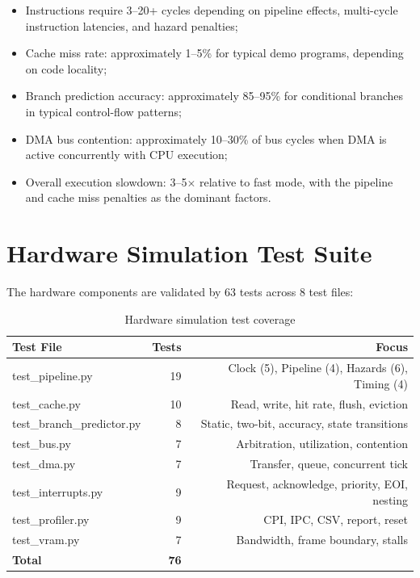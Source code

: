 \documentclass[12pt,a4paper,twoside]{book}
\theoremstyle{trinarytheorem}
\theoremstyle{trinarydefinition}
\newcommand{\code}[1]{\textsf{#1}}
\begin{document}
\begin{itemize}
    \item Instructions require 3--20+ cycles depending on pipeline effects,
          multi-cycle instruction latencies, and hazard penalties;
    \item Cache miss rate: approximately 1--5\% for typical demo programs,
          depending on code locality;
    \item Branch prediction accuracy: approximately 85--95\% for conditional
          branches in typical control-flow patterns;
    \item DMA bus contention: approximately 10--30\% of bus cycles when DMA
          is active concurrently with CPU execution;
    \item Overall execution slowdown: 3--5$\times$ relative to fast mode,
          with the pipeline and cache miss penalties as the dominant factors.
\end{itemize}

\section{Hardware Simulation Test Suite}

The hardware components are validated by 63 tests across 8 test files:

\begin{table}[H]
\centering
\caption{Hardware simulation test coverage}
\label{tab:hwtests}
\begin{tabular}{lrr}
\toprule
Test File & Tests & Focus \\
\midrule
\code{test\_pipeline.py} & 19 & Clock (5), Pipeline (4), Hazards (6), Timing (4) \\
\code{test\_cache.py} & 10 & Read, write, hit rate, flush, eviction \\
\code{test\_branch\_predictor.py} & 8 & Static, two-bit, accuracy, state transitions \\
\code{test\_bus.py} & 7 & Arbitration, utilization, contention \\
\code{test\_dma.py} & 7 & Transfer, queue, concurrent tick \\
\code{test\_interrupts.py} & 9 & Request, acknowledge, priority, EOI, nesting \\
\code{test\_profiler.py} & 9 & CPI, IPC, CSV, report, reset \\
\code{test\_vram.py} & 7 & Bandwidth, frame boundary, stalls \\
\midrule
\textbf{Total} & \textbf{76} & \\
\bottomrule
\end{tabular}
\end{table}
\end{document}
